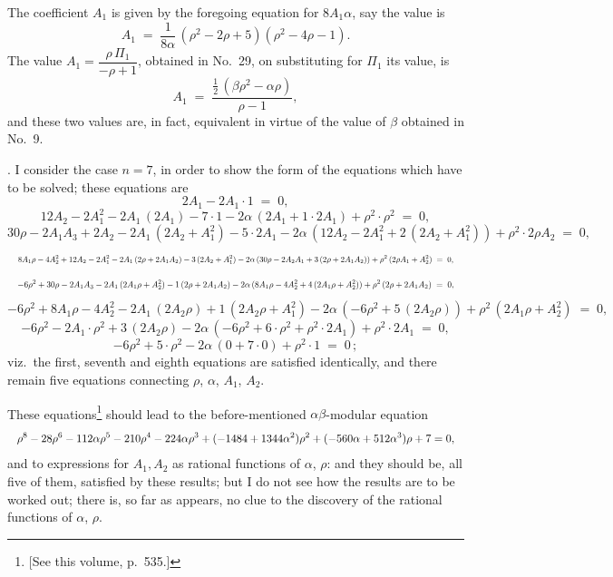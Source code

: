 \documentclass[11pt]{article}
\begin{document}
\medskip

\noindent The coefficient $A_1$ is given by the foregoing equation for $8 A_1\alpha$, say the value is
\[
A_1 \;=\; \frac{1}{8\alpha}\,(\rho^2 - 2\rho + 5)(\rho^2 - 4\rho - 1).
\]
The value $A_1 = \dfrac{\rho\,\Pi_1}{-\rho + 1}$, obtained in No.~29, on substituting for $\Pi_1$ its value, is
\[
A_1 \;=\; \frac{\tfrac{1}{2}\,(\beta\rho^2 - \alpha\rho)}{\rho - 1},
\]
and these two values are, in fact, equivalent in virtue of the value of $\beta$ obtained in No.~9.

\newpage

. I consider the case $n = 7$, in order to show the form of the equations which have to be solved; these equations are
\[
2 A_1 - 2 A_1\cdot 1 \;=\; 0,
\]
\[
12 A_2 - 2 A_1^2 - 2 A_1\,(2 A_1) - 7\cdot 1 - 2\alpha\,(2 A_1 + 1\cdot 2 A_1) + \rho^2\cdot\rho^2 \;=\; 0,
\]
\[
30\rho - 2 A_1 A_3 + 2 A_2 - 2 A_1\,(2 A_2 + A_1^2) - 5\cdot 2 A_1 - 2\alpha\,(12 A_2 - 2 A_1^2 + 2\,(2 A_2 + A_1^2)) + \rho^2\cdot 2\rho A_2 \;=\; 0,
\]
\[
\resizebox{\textwidth}{!}{$\displaystyle
8 A_1\rho - 4 A_2^2 + 12 A_2 - 2 A_1^2 - 2 A_1\,(2\rho + 2 A_1 A_2) - 3\,(2 A_2 + A_1^2) - 2\alpha\,(30\rho - 2 A_2 A_1 + 3\,(2\rho + 2 A_1 A_2)) + \rho^2\,(2\rho A_1 + A_2^2) \;=\; 0,
$}
\]
\[
\resizebox{\textwidth}{!}{$\displaystyle
-6\rho^2 + 30\rho - 2 A_1 A_3 - 2 A_1\,(2 A_1\rho + A_2^2) - 1\,(2\rho + 2 A_1 A_2) - 2\alpha\,(8 A_1\rho - 4 A_2^2 + 4\,(2 A_1\rho + A_2^2)) + \rho^2\,(2\rho + 2 A_1 A_2) \;=\; 0,
$}
\]
\[
-6\rho^2 + 8 A_1\rho - 4 A_2^2 - 2 A_1\,(2 A_2\rho) + 1\,(2 A_2\rho + A_1^2) - 2\alpha\,(-6\rho^2 + 5\,(2 A_2\rho)) + \rho^2\,(2 A_1\rho + A_2^2) \;=\; 0,
\]
\[
-6\rho^2 - 2 A_1\cdot\rho^2 + 3\,(2 A_2\rho) - 2\alpha\,(-6\rho^2 + 6\cdot\rho^2 + \rho^2\cdot 2 A_1) + \rho^2\cdot 2 A_1 \;=\; 0,
\]
\[
-6\rho^2 + 5\cdot\rho^2 - 2\alpha\,(0 + 7\cdot 0) + \rho^2\cdot 1 \;=\; 0\,;
\]
viz.\ the first, seventh and eighth equations are satisfied identically, and there remain five equations connecting $\rho$, $\alpha$, $A_1$, $A_2$.

\medskip

\noindent These equations\footnote{[See this volume, p.~535.]} should lead to the before-mentioned $\alpha\beta$-modular equation
\[
\resizebox{\textwidth}{!}{$\displaystyle
\rho^8 - 28\rho^6 - 112\alpha\rho^5 - 210\rho^4 - 224\alpha\rho^3 + (-1484 + 1344\alpha^2)\rho^2 + (-560\alpha + 512\alpha^3)\rho + 7 = 0,
$}
\]
and to expressions for $A_1, A_2$ as rational functions of $\alpha$, $\rho$: and they should be, all five of them, satisfied by these results; but I do not see how the results are to be worked out; there is, so far as appears, no clue to the discovery of the rational functions of $\alpha$, $\rho$.
\end{document}
